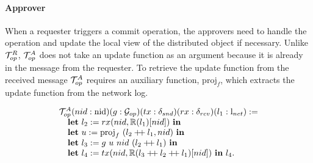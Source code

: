 \paragraph{Approver}
When a requester triggers a commit operation, the approvers need to
handle the operation and update the local view of the distributed object if
necessary. Unlike $\mathcal{T}^{R}_{op}$, $\mathcal{T}^{A}_{op}$ does not take an update function as an argument
because it is already in the message from the requester.
To retrieve the update function from the received message $\mathcal{T}^{A}_{op}$ requires
an auxiliary function, $\mathrm{proj}_{f}$, which extracts the update function from the network log.
\vspace{-0.2em}
\begin{small}
$$
\begin{array}{l}
	\ophfunction (nid: \nodeid) (g:  \gopfunction)
	(tx: \sendfunction)(rx: \recvfunction)(l_1  :\networklog ) := \\
\ \ \ \mbox{\textbf{let}} \ l_2 := rx(nid, \replay(l_1)[nid]) \
  \mbox{\textbf{in}} \\
\ \ \ \mbox{\textbf{let}} \ u := \mathrm{proj}_{f} \ (l_2 \mdoubleplus l_1, nid) \
  \mbox{\textbf{in}} \\
\ \ \ \mbox{\textbf{let}}\ l_3  := g\ u\ nid \ (l_2 \mdoubleplus l_1) \ \mbox{\textbf{in}} \\
\ \ \ \mbox{\textbf{let}} \ l_4 := tx(nid, \replay(l_3 \mdoubleplus l_2 \mdoubleplus l_1)[nid]) \ \mbox{\textbf{in}}  \ l_4.
   \\
\end{array}
$$
\end{small}
\vspace{-1em}

